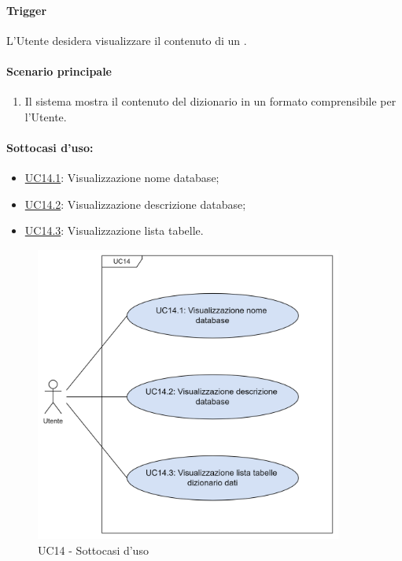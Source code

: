 \paragraph*{Trigger}
L'Utente desidera visualizzare il contenuto di un .

\paragraph*{Scenario principale}
\begin{enumerate}
  \item Il sistema mostra il contenuto del dizionario in un formato comprensibile per l'Utente.
\end{enumerate}

\paragraph*{Sottocasi d'uso:}
\begin{itemize}
  \item \hyperref[UC14point1]{UC14.1}: Visualizzazione nome database;
  \item \hyperref[UC14point2]{UC14.2}: Visualizzazione descrizione database;
  \item \hyperref[UC14point3]{UC14.3}: Visualizzazione lista tabelle.
\end{itemize}

\begin{figure}[H]
  \centering
  \includegraphics[width=0.90\textwidth]{assets/uc14_1.png}
  \caption{UC14 - Sottocasi d'uso}
\end{figure}

